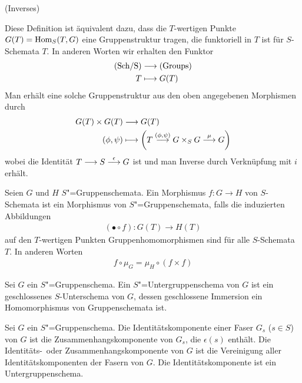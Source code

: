 \documentclass[german]{scrreprt}
\begin{document}
\begin{Definition}[$S$"=Gruppenschema]
\begin{enumerate}[label=(\alph*)]
    \hfill(Inverses)
  \end{enumerate}
  \begin{Bemerkung}
    Diese Definition ist äquivalent dazu, dass die $T$-wertigen Punkte
    $G(T)=\operatorname{Hom}_S(T,G)$ eine Gruppenstruktur tragen, die funktoriell in
    $T$ ist für $S$-Schemata $T$.
    In anderen Worten wir erhalten den Funktor 
    \begin{align*}
      \text{(Sch/S)} &\longrightarrow \text{(Groups)}\\
      T &\longmapsto G(T)
    \end{align*}
    Man erhält eine solche Gruppenstruktur aus den oben angegebenen
    Morphismen durch
    \begin{align*}
      G(T)\times G(T) &\longrightarrow G(T)\\
      (\phi, \psi) &\longmapsto 
                     \left(
                     T\overset{(\phi,\psi)}{\longrightarrow} G\times_S G
                     \overset\mu{\longrightarrow} G
                     \right)
    \end{align*}
    wobei die Identität $T\longrightarrow S\overset{\epsilon}{\longrightarrow} G$ ist und
    man Inverse durch Verknüpfung mit $i$ erhält.
  \end{Bemerkung}

  \begin{Definition}
    Seien $G$ und $H$ $S$"=Gruppenschemata.
    Ein Morphismus $f\colon G\to H$ von $S$-Schemata ist ein Morphismus
    von $S$"=Gruppenschemata, falls die induzierten Abbildungen
    \begin{gather*}
      (\bullet\circ f)\colon G(T)\to H(T)
    \end{gather*}auf den $T$-wertigen Punkten
    Gruppenhomomorphismen sind für alle $S$-Schemata $T$.
    In anderen Worten
    \begin{gather*}
      f\circ\mu_G = \mu_H\circ(f\times f)
    \end{gather*}
  \end{Definition}

\begin{Definition}[Untergruppenschema]
  Sei $G$ ein $S$"=Gruppenschema.
  Ein $S$"=Untergruppenschema von $G$ ist ein geschlossenes
  $S$-Unterschema von $G$, dessen geschlossene Immersion ein
  Homomorphismus von Gruppenschemata ist.
\end{Definition}
\begin{Definition}[Identitätskomponente]
  Sei $G$ ein $S$"=Gruppenschema.
  Die Identitätskomponente einer Faser $G_s$ ($s\in S$) von $G$ ist
  die Zusammenhangskomponente von $G_s$, die $\epsilon(s)$ enthält.
  Die Identitäts-~oder Zusammenhangskomponente von $G$ ist
  die Vereinigung aller Identitätskomponenten der Fasern von $G$.
  Die Identitätskomponente ist ein Untergruppenschema.
\end{Definition}


\end{Definition}
\end{document}
